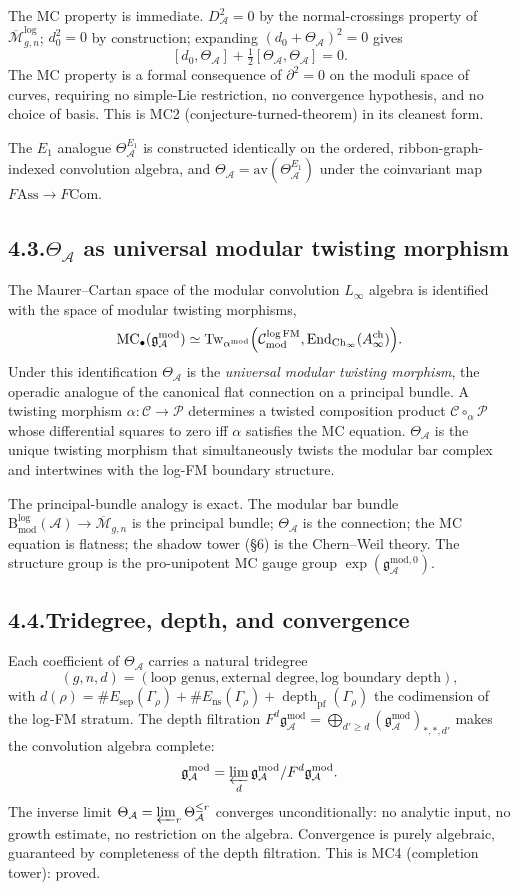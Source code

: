 \documentclass[11pt]{report}
\theoremstyle{definition}
\theoremstyle{remark}
\providecommand{\cA}{\mathcal{A}}
\providecommand{\cC}{\mathcal{C}}
\providecommand{\cM}{\mathcal{M}}
\providecommand{\cP}{\mathcal{P}}
\providecommand{\gAmod}{\mathfrak{g}^{\mathrm{mod}}_\cA}
\providecommand{\Ass}{\mathrm{Ass}}
\providecommand{\Com}{\mathrm{Com}}
\numberwithin{equation}{section}
\begin{document}
The MC property is immediate. $D_\cA^2=0$ by the normal-crossings
property of $\overline{\cM}_{g,n}^{\log}$; $d_0^2=0$ by construction;
expanding $(d_0+\Theta_\cA)^2=0$ gives
\[
[d_0,\Theta_\cA]+\tfrac12[\Theta_\cA,\Theta_\cA]=0.
\]
The MC property is a formal consequence of $\partial^2=0$ on the
moduli space of curves, requiring no simple-Lie restriction, no
convergence hypothesis, and no choice of basis. This is MC2
(conjecture-turned-theorem) in its cleanest form.

The $E_1$ analogue $\Theta^{E_1}_\cA$ is constructed identically on
the ordered, ribbon-graph-indexed convolution algebra, and
$\Theta_\cA=\mathrm{av}(\Theta^{E_1}_\cA)$ under the coinvariant map
$F\!\Ass\to F\Com$.

\subsection*{4.3.\enspace $\Theta_\cA$ as universal modular twisting morphism}

The Maurer--Cartan space of the modular convolution $L_\infty$
algebra is identified with the space of modular twisting morphisms,
\[
\operatorname{MC}_\bullet(\gAmod)\simeq\operatorname{Tw}_{\alpha^{\mathrm{mod}}}\Bigl(\cC^{\log\mathrm{FM}}_{\mathrm{mod}},\operatorname{End}_{\mathrm{Ch}_\infty}(A^{\mathrm{ch}}_\infty)\Bigr).
\]
Under this identification $\Theta_\cA$ is the \emph{universal modular
twisting morphism}, the operadic analogue of the canonical flat
connection on a principal bundle. A twisting morphism
$\alpha\colon\cC\to\cP$ determines a twisted composition product
$\cC\circ_\alpha\cP$ whose differential squares to zero iff $\alpha$
satisfies the MC equation. $\Theta_\cA$ is the unique twisting
morphism that simultaneously twists the modular bar complex and
intertwines with the log-FM boundary structure.

The principal-bundle analogy is exact. The modular bar bundle
$\mathrm B^{\log}_{\mathrm{mod}}(\cA)\to\overline{\cM}_{g,n}$ is the
principal bundle; $\Theta_\cA$ is the connection; the MC equation is
flatness; the shadow tower (\S6) is the Chern--Weil theory. The
structure group is the pro-unipotent MC gauge group
$\exp(\mathfrak g^{\mathrm{mod},0}_\cA)$.

\subsection*{4.4.\enspace Tridegree, depth, and convergence}

Each coefficient of $\Theta_\cA$ carries a natural tridegree
\[
(g,n,d)=(\text{loop genus},\text{external degree},\text{log boundary depth}),
\]
with $d(\rho)=\#E_{\mathrm{sep}}(\Gamma_\rho)+\#E_{\mathrm{ns}}(\Gamma_\rho)+\operatorname{depth}_{\mathrm{pf}}(\Gamma_\rho)$
the codimension of the log-FM stratum. The depth filtration
$F^d\gAmod=\bigoplus_{d'\ge d}(\gAmod)_{*,*,d'}$ makes the convolution
algebra complete:
\[
\gAmod=\varprojlim_d\gAmod/F^d\gAmod.
\]
The inverse limit $\Theta_\cA=\varprojlim_r\Theta_\cA^{\le r}$
converges unconditionally: no analytic input, no growth estimate, no
restriction on the algebra. Convergence is purely algebraic,
guaranteed by completeness of the depth filtration. This is MC4
(completion tower): proved.
\end{document}
